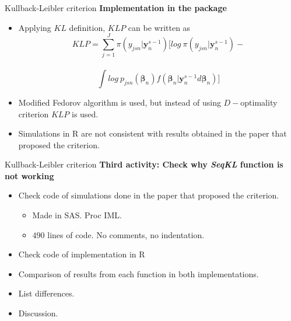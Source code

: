 \documentclass[11pt,t]{beamer}
\begin{document}
\begin{frame}[fragile]{Kullback-Leibler criterion}
	\textbf{Implementation in the package}
	\begin{itemize}
		\item Applying $KL$ definition, $KLP$ can be written as
$$KLP = \sum_{j=1}^J \pi (y_{jsn}|\mathbf{y}_n^{s-1}) [ log \ \pi (y_{jsn}|\mathbf{y}_n^{s-1}) - $$ \\ $$\int log \ p_{jsn}(\pmb{\beta}_n)f(\pmb{\beta}_n|\mathbf{y}_n^{s-1} d \pmb{\beta}_n) ]$$

		\item Modified Fedorov algorithm is used, but instead of using $D-$optimality criterion $KLP$ is used.
		\item Simulations in R are not consistent with results obtained in the paper that proposed the criterion.
	\end{itemize}
\end{frame}

\begin{frame}[fragile]{Kullback-Leibler criterion}
	\textbf{Third activity: Check why \textit{SeqKL} function is not working}
	\begin{itemize}
		\item Check code of simulations done in the paper that proposed the criterion.
		\begin{itemize}
			\item Made in SAS. Proc IML.
			\item $490$ lines of code. No comments, no indentation.
		\end{itemize}
		\item Check code of implementation in R
		\item Comparison of results from each function in both implementations.
		\item List differences.
		\item Discussion.

	\end{itemize}
\end{frame}
\end{document}
